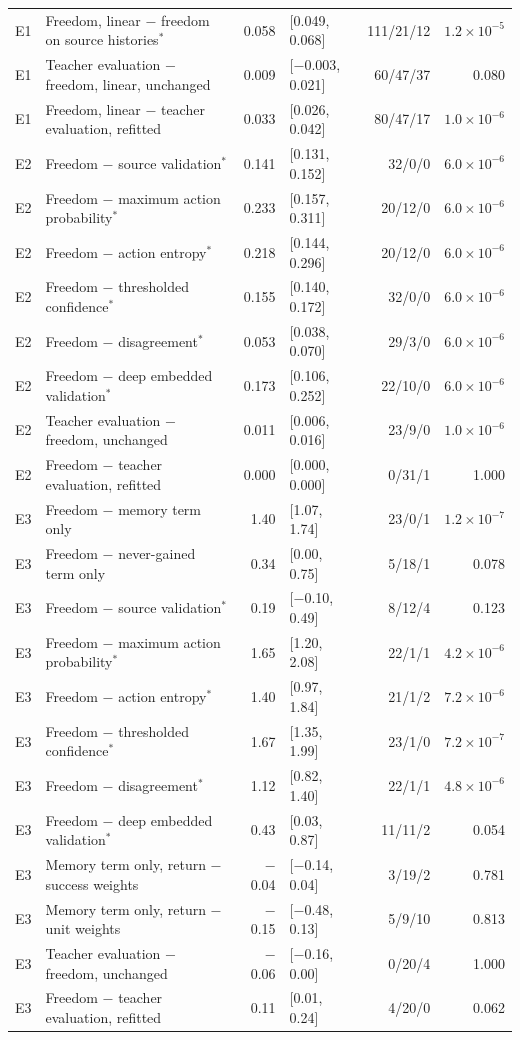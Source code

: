 \begin{table}[t]
\begin{tabular}{@{}l>{\raggedright\arraybackslash}p{6.4cm}rlrr@{}}
E1 & Freedom, linear $-$ freedom on source histories$^*$ & 0.058 & [0.049, 0.068] & 111/21/12 & $1.2\times10^{-5}$ \\
E1 & Teacher evaluation $-$ freedom, linear, unchanged & 0.009 & [$-$0.003, 0.021] & 60/47/37 & 0.080 \\
E1 & Freedom, linear $-$ teacher evaluation, refitted & 0.033 & [0.026, 0.042] & 80/47/17 & $1.0\times10^{-6}$ \\
\midrule
E2 & Freedom $-$ source validation$^*$ & 0.141 & [0.131, 0.152] & 32/0/0 & $6.0\times10^{-6}$ \\
E2 & Freedom $-$ maximum action probability$^*$ & 0.233 & [0.157, 0.311] & 20/12/0 & $6.0\times10^{-6}$ \\
E2 & Freedom $-$ action entropy$^*$ & 0.218 & [0.144, 0.296] & 20/12/0 & $6.0\times10^{-6}$ \\
E2 & Freedom $-$ thresholded confidence$^*$ & 0.155 & [0.140, 0.172] & 32/0/0 & $6.0\times10^{-6}$ \\
E2 & Freedom $-$ disagreement$^*$ & 0.053 & [0.038, 0.070] & 29/3/0 & $6.0\times10^{-6}$ \\
E2 & Freedom $-$ deep embedded validation$^*$ & 0.173 & [0.106, 0.252] & 22/10/0 & $6.0\times10^{-6}$ \\
E2 & Teacher evaluation $-$ freedom, unchanged & 0.011 & [0.006, 0.016] & 23/9/0 & $1.0\times10^{-6}$ \\
E2 & Freedom $-$ teacher evaluation, refitted & 0.000 & [0.000, 0.000] & 0/31/1 & 1.000 \\
\midrule
E3 & Freedom $-$ memory term only & 1.40 & [1.07, 1.74] & 23/0/1 & $1.2\times10^{-7}$ \\
E3 & Freedom $-$ never-gained term only & 0.34 & [0.00, 0.75] & 5/18/1 & 0.078 \\
E3 & Freedom $-$ source validation$^*$ & 0.19 & [$-$0.10, 0.49] & 8/12/4 & 0.123 \\
E3 & Freedom $-$ maximum action probability$^*$ & 1.65 & [1.20, 2.08] & 22/1/1 & $4.2\times10^{-6}$ \\
E3 & Freedom $-$ action entropy$^*$ & 1.40 & [0.97, 1.84] & 21/1/2 & $7.2\times10^{-6}$ \\
E3 & Freedom $-$ thresholded confidence$^*$ & 1.67 & [1.35, 1.99] & 23/1/0 & $7.2\times10^{-7}$ \\
E3 & Freedom $-$ disagreement$^*$ & 1.12 & [0.82, 1.40] & 22/1/1 & $4.8\times10^{-6}$ \\
E3 & Freedom $-$ deep embedded validation$^*$ & 0.43 & [0.03, 0.87] & 11/11/2 & 0.054 \\
E3 & Memory term only, return $-$ success weights & $-$0.04 & [$-$0.14, 0.04] & 3/19/2 & 0.781 \\
E3 & Memory term only, return $-$ unit weights & $-$0.15 & [$-$0.48, 0.13] & 5/9/10 & 0.813 \\
E3 & Teacher evaluation $-$ freedom, unchanged & $-$0.06 & [$-$0.16, 0.00] & 0/20/4 & 1.000 \\
E3 & Freedom $-$ teacher evaluation, refitted & 0.11 & [0.01, 0.24] & 4/20/0 & 0.062 \\
\bottomrule
\end{tabular}
\end{table}
